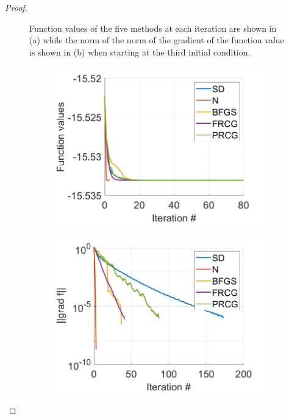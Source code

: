 \documentclass[12pt]{report}
\begin{document}
\begin{problem}
\begin{proof}
\begin{figure}[H]
\begin{subfigure}[b]{0.5\linewidth}
                \caption{}
                \label{fig3:b}
                \vspace{4ex}
            \end{subfigure}
            \caption{Function values of the five methods at each iteration are shown in (a) while the norm of the norm of the gradient of the function value is shown in (b) when starting at the third initial condition.}
            \label{fig3}
        \end{figure}
        \begin{figure}[H]
            \begin{subfigure}[b]{0.5\linewidth}
                \centering
                \includegraphics[width=\linewidth]{images/4-funcval.png}
                \caption{}
                \label{fig4:a}
                \vspace{4ex}
            \end{subfigure}%
            \begin{subfigure}[b]{0.5\linewidth}
                \centering
                \includegraphics[width=\linewidth]{images/4-gradf.png}

\end{subfigure}
\end{figure}
\end{proof}
\end{problem}
\end{document}
